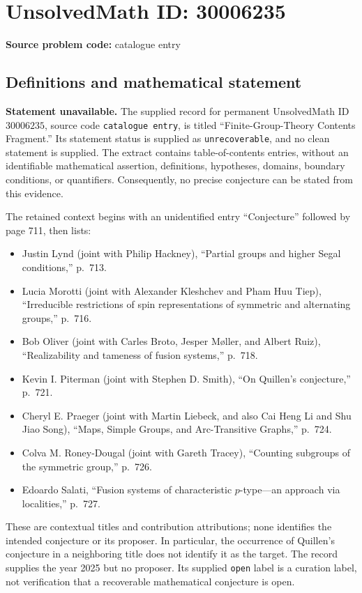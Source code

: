 \documentclass[11pt]{article}
\begin{document}
\section*{UnsolvedMath ID: 30006235}
\textbf{Source problem code:} catalogue entry
\subsection{Definitions and mathematical statement}
\textbf{Statement unavailable.} The supplied record for permanent UnsolvedMath ID \(30006235\), source code \texttt{catalogue entry}, is titled ``Finite-Group-Theory Contents Fragment.'' Its statement status is supplied as \texttt{unrecoverable}, and no clean statement is supplied. The extract contains table-of-contents entries, without an identifiable mathematical assertion, definitions, hypotheses, domains, boundary conditions, or quantifiers. Consequently, no precise conjecture can be stated from this evidence.

The retained context begins with an unidentified entry ``Conjecture'' followed by page 711, then lists:
\begin{itemize}
\item Justin Lynd (joint with Philip Hackney), ``Partial groups and higher Segal conditions,'' p.~713.
\item Lucia Morotti (joint with Alexander Kleshchev and Pham Huu Tiep), ``Irreducible restrictions of spin representations of symmetric and alternating groups,'' p.~716.
\item Bob Oliver (joint with Carles Broto, Jesper Møller, and Albert Ruiz), ``Realizability and tameness of fusion systems,'' p.~718.
\item Kevin I. Piterman (joint with Stephen D. Smith), ``On Quillen's conjecture,'' p.~721.
\item Cheryl E. Praeger (joint with Martin Liebeck, and also Cai Heng Li and Shu Jiao Song), ``Maps, Simple Groups, and Arc-Transitive Graphs,'' p.~724.
\item Colva M. Roney-Dougal (joint with Gareth Tracey), ``Counting subgroups of the symmetric group,'' p.~726.
\item Edoardo Salati, ``Fusion systems of characteristic \(p\)-type---an approach via localities,'' p.~727.
\end{itemize}
These are contextual titles and contribution attributions; none identifies the intended conjecture or its proposer. In particular, the occurrence of Quillen's conjecture in a neighboring title does not identify it as the target. The record supplies the year 2025 but no proposer. Its supplied \texttt{open} label is a curation label, not verification that a recoverable mathematical conjecture is open.
\end{document}
